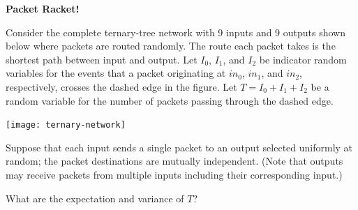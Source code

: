 \documentclass[12pt,oneside]{article}
\newcommand{\ptitle}[1]{\textbf{\hspace{0.2cm}#1}}
\begin{document}
\instatements{\newpage}
\begin{problem}{15} \label{network} \ptitle{Packet Racket!}

Consider the complete ternary-tree network with 9 inputs and 9 outputs shown below where packets are routed randomly. The route each packet takes is the shortest path between input and output. Let $I_0$, $I_1$, and $I_2$ be indicator random variables for the events that a packet originating at $in_0$, $in_1$, and $in_2$, respectively, crosses the dashed edge in the figure.
Let $T=I_0+I_1+I_2$ be a random variable for the number of packets 
passing through the dashed edge. 

\vspace{12pt}
\centerline{\texttt{[image: ternary-network]}}
\vspace{12pt}

\bparts
%

Suppose that each input sends a single packet to an output selected uniformly at random; the packet destinations are mutually independent. (Note that outputs may receive packets from multiple inputs including their corresponding input.)  

What are the expectation and variance of $T$?

\end{problem}
\end{document}
